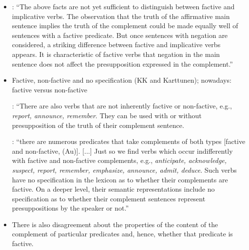 \documentclass[11pt,fleqn]{article}
\newcommand{\6}{\mbox{$[\hspace*{-.6mm}[$}}
\newcommand{\9}{\mbox{$]\hspace*{-.6mm}]$}}
\begin{document}
\begin{itemize}

\item \citealt[342f]{karttunen71-implicative}: ``The above facts are not yet sufficient to distinguish between factive and implicative verbs. The observation that the truth of the affirmative main sentence implies the truth of the complement could be made equally well of sentences with a factive predicate. But once sentences with negation are considered, a striking difference between factive and implicative verbs appears. It is characteristic of factive verbs that negation in the main sentence does not affect the presupposition expressed in the complement.''

\item Factive, non-factive and no specification (KK and Karttunen); nowadays: factive versus non-factive

\citealt[340]{karttunen71-implicative}: ``There are also verbs that are not inherently factive or non-factive, e.g., {\em report, announce, remember}. They can be used with or without presupposition of the truth of their complement sentence.

\citealt[163]{kiparsky-kiparsky70}: ``there are numerous predicates that take complements of both types [factive and non-factive, (Au)].  [...] Just so we find verbs which occur indifferently with factive and non-factive complements, e.g., {\em anticipate, acknowledge, suspect, report, remember, emphasize, announce, admit, deduce}. Such verbs have no specification in the lexicon as to whether their complements are factive. On a deeper level, their semantic representations include no specification as to whether their complement sentences represent presuppositions by the speaker or not.''

%

\item  There is also disagreement about the properties of the content of the complement of particular predicates and, hence, whether that predicate is factive. 


\end{itemize}
\end{document}
